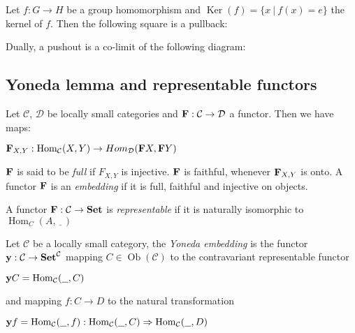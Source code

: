 \documentclass[a4paper]{article}
\theoremstyle{defin}
\theoremstyle{theorem}
\theoremstyle{claim}
\theoremstyle{prop}
\theoremstyle{lemma}
\theoremstyle{fact}
\theoremstyle{ex}
\theoremstyle{col}
\begin{document}
Let $f : G \to H$ be a group homomorphism and $\operatorname{Ker}(f) = \{ x \: | \: f(x) = e \}$ the kernel of $f$. Then the following square is a pullback:

\centerline{
}

Dually, a pushout is a co-limit of the following diagram:

\centerline{
}

\subsection{Yoneda lemma and representable functors}

Let $\mathcal{C}$, $\mathcal{D}$ be locally small categories and ${\bf F} : \mathcal{C} \to \mathcal{D}$ a functor.
Then we have maps:
\begin{center}
${\bf F}_{X, Y} : \operatorname{Hom}_{\mathcal{C}}(X, Y) \to Hom_{\mathcal{D}}({\bf F} X, {\bf F} Y)$
\end{center}

${\bf F}$ is said to be \emph{full} if $F_{X, Y}$ is injective. ${\bf F}$ is faithful, whenever ${\bf F}_{X, Y}$ is onto. A functor ${\bf F}$ is an \emph{embedding} if it is full, faithful and injective on objects.

A functor ${\bf F} : \mathcal{C} \to {\bf Set}$ is \emph{representable} if it is naturally isomorphic to $\operatorname{Hom}_{C}(A, \underline{\:\:\:})$

Let $\mathcal{C}$ be a locally small category, the \emph{Yoneda embedding} is the functor ${\bf y} : \mathcal{C} \to {\bf Set}^{\mathcal{C}}$ mapping $C \in \operatorname{Ob}(\mathcal{C})$ to the contravariant representable functor
\begin{center}
${\bf y} C = \operatorname{Hom}_{\mathcal{C}}(\underline{\:\:\:}, C)$
\end{center}
and mapping $f : C \to D$ to the natural transformation
\begin{center}
${\bf y} f = \operatorname{Hom}_{\mathcal{C}}(\underline{\:\:\:}, f) : \operatorname{Hom}_{\mathcal{C}}(\underline{\:\:\:}, C) \Rightarrow \operatorname{Hom}_{\mathcal{C}}(\underline{\:\:\:}, D)$
\end{center}
\end{document}
